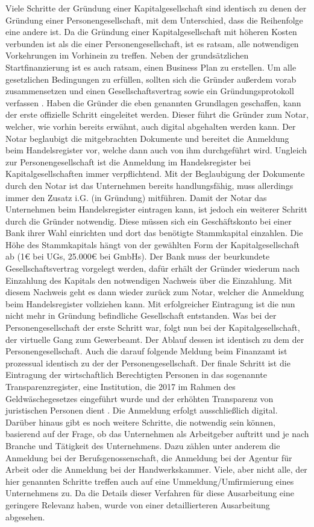 Viele Schritte der Gründung einer Kapitalgesellschaft sind identisch zu denen der Gründung einer Personengesellschaft, mit dem Unterschied, dass die Reihenfolge eine andere ist. Da die Gründung einer Kapitalgesellschaft mit höheren Kosten verbunden ist als die einer Personengesellschaft, ist es ratsam, alle notwendigen Vorkehrungen im Vorhinein zu treffen. Neben der grundsätzlichen Startfinanzierung ist es auch ratsam, einen Business Plan zu erstellen. Um alle gesetzlichen Bedingungen zu erfüllen, sollten sich die Gründer außerdem vorab zusammensetzen und einen Gesellschaftsvertrag sowie ein Gründungsprotokoll verfassen . Haben die Gründer die eben genannten Grundlagen geschaffen, kann der erste offizielle Schritt eingeleitet werden. Dieser führt die Gründer zum Notar, welcher, wie vorhin bereits erwähnt, auch digital abgehalten werden kann. Der Notar beglaubigt die mitgebrachten Dokumente und bereitet die Anmeldung beim Handelsregister vor, welche dann auch von ihm durchgeführt wird. Ungleich zur Personengesellschaft ist die Anmeldung im Handelsregister bei Kapitalgesellschaften immer verpflichtend. Mit der Beglaubigung der Dokumente durch den Notar ist das Unternehmen bereits handlungsfähig, muss allerdings immer den Zusatz i.G. (in Gründung) mitführen. Damit der Notar das Unternehmen beim Handelsregister eintragen kann, ist jedoch ein weiterer Schritt durch die Gründer notwendig. Diese müssen sich ein Geschäftskonto bei einer Bank ihrer Wahl einrichten und dort das benötigte Stammkapital einzahlen. Die Höhe des Stammkapitals hängt von der gewählten Form der Kapitalgesellschaft ab (1€ bei UGs, 25.000€ bei GmbHs). Der Bank muss der beurkundete Gesellschaftsvertrag vorgelegt werden, dafür erhält der Gründer wiederum nach Einzahlung des Kapitals den notwendigen Nachweis über die Einzahlung. Mit diesem Nachweis geht es dann wieder zurück zum Notar, welcher die Anmeldung beim Handelsregister vollziehen kann. Mit erfolgreicher Eintragung ist die nun nicht mehr in Gründung befindliche Gesellschaft entstanden. Was bei der Personengesellschaft der erste Schritt war, folgt nun bei der Kapitalgesellschaft, der virtuelle Gang zum Gewerbeamt. Der Ablauf dessen ist identisch zu dem der Personengesellschaft. Auch die darauf folgende Meldung beim Finanzamt ist prozessual identisch zu der der Personengesellschaft. Der finale Schritt ist die Eintragung der wirtschaftlich Berechtigten Personen in das sogenannte Transparenzregister, eine Institution, die 2017 im Rahmen des Geldwäschegesetzes eingeführt wurde und der erhöhten Transparenz von juristischen Personen dient . Die Anmeldung erfolgt ausschließlich digital. Darüber hinaus gibt es noch weitere Schritte, die notwendig sein können, basierend auf der Frage, ob das Unternehmen als Arbeitgeber auftritt und je nach Branche und Tätigkeit des Unternehmens. Dazu zählen unter anderem die Anmeldung bei der Berufsgenossenschaft, die Anmeldung bei der Agentur für Arbeit oder die Anmeldung bei der Handwerkskammer. Viele, aber nicht alle, der hier genannten Schritte treffen auch auf eine Ummeldung/Umfirmierung eines Unternehmens zu. Da die Details dieser Verfahren für diese Ausarbeitung eine geringere Relevanz haben, wurde von einer detaillierteren Ausarbeitung abgesehen.